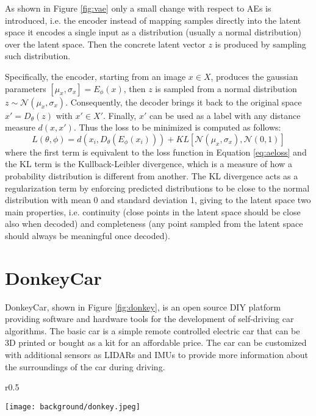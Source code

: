As shown in Figure \ref{fig:vae} only a small change with respect to AEs is introduced, i.e. the encoder instead of mapping samples directly into the latent space it encodes a single input as a distribution (usually a normal distribution) over the latent space. Then the concrete latent vector $z$ is produced by sampling such distribution. 

Specifically, the encoder, starting from an image $x\in X$, produces the gaussian parameters ${[\mu_x, \sigma_x]=E_{\phi }(x)}$, then $z$ is sampled from a normal distribution $z \sim \mathcal{N}(\mu_x, \sigma_x)$. Consequently, the decoder brings it back to the original space ${x'=D_{\theta }(z)}$ with $x'\in X'$. Finally, $x'$ can be used as a label with any distance measure $d(x,x')$. Thus the loss to be minimized is computed as follows:
\begin{equation}
\label{eq:vaeloss}
  L(\theta ,\phi) = d(x_{i},D_{\theta }(E_{\phi }(x_{i}))) + KL[\mathcal{N} (\mu_x, \sigma_x),\mathcal{N}(0, 1)]
\end{equation}
where the first term is equivalent to the loss function in Equation \ref{eq:aeloss} and the KL term is the Kullback-Leibler divergence, which is a measure of how a probability distribution is different from another. The KL divergence acts as a regularization term by enforcing predicted distributions to be close to the normal distribution with mean 0 and standard deviation 1, giving to the latent space two main properties, i.e. continuity (close points in the latent space should be close also when decoded) and completeness (any point sampled from the latent space should always be meaningful once decoded). 

\section{DonkeyCar} \label{sec:donkeycar}
DonkeyCar, shown in Figure \ref{fig:donkey}, is an open source DIY platform providing software and hardware tools for the development of self-driving car algorithms. The basic car is a simple remote controlled electric car that can be 3D printed or bought as a kit for an affordable price. The car can be customized with additional sensors as LIDARs and IMUs to provide more information about the surroundings of the car during driving.

\begin{wrapfigure}[19]{r}{0.5\textwidth}
  \begin{center}
    \texttt{[image: background/donkey.jpeg]}
  \end{center}
  \caption{Assembled DonkeyCar}
  \label{fig:donkey}
\end{wrapfigure}

